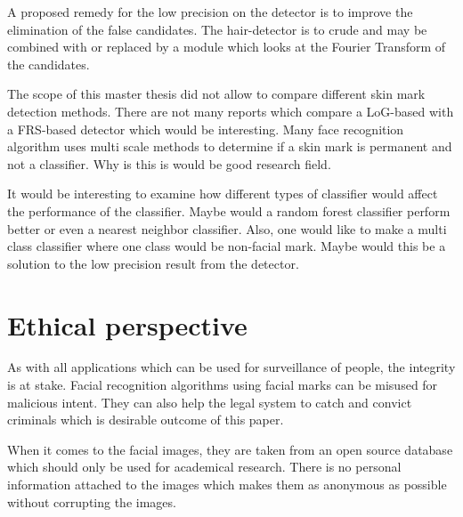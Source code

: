 A proposed remedy for the low precision on the detector is to improve the elimination of the false candidates. The hair-detector is to crude and may be combined with or replaced by a module which looks at the Fourier Transform of the candidates. 

The scope of this master thesis did not allow to compare different skin mark detection methods. There are not many reports which compare a LoG-based with a FRS-based detector which would be interesting. Many face recognition algorithm uses multi scale methods to determine if a skin mark is permanent and not a classifier. Why is this is would be good research field.   

It would be interesting to examine how different types of classifier would affect the performance of the classifier. Maybe would a random forest classifier perform better or even a nearest neighbor classifier. Also, one would like to make a multi class classifier where one class would be non-facial mark. Maybe would this be a solution to the low precision result from the detector.  

\section{Ethical perspective}

As with all applications which can be used for surveillance of people, the integrity is at stake. Facial recognition algorithms using facial marks can be misused for malicious intent. They can also help the legal system to catch and convict criminals which is desirable outcome of this paper. 

When it comes to the facial images, they are taken from an open source database which should only be used for academical research. There is no personal information attached to the images which makes them as anonymous as possible without corrupting the images.    